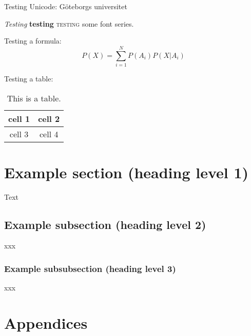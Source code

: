 \documentclass[11pt, a4paper]{article}
\begin{document}
Testing Unicode: Göteborgs universitet

\textit{Testing} \textbf{testing} \textsc{testing} some font series.

Testing a formula:
\[ P(X) = \sum_{i=1}^N P(A_i) P(X|A_i)
\]

Testing a table:
\begin{table}[htbp]
\begin{center}
\begin{tabular}{c|c} cell 1 & cell 2 \\ \hline cell 3 & cell 4
\end{tabular}
\caption{This is a table.}
\end{center}
\end{table}

\newpage

\section{Example section (heading level 1)}

Text

\subsection{Example subsection (heading level 2)}

xxx

\subsubsection{Example subsubsection (heading level 3)}

xxx

\newpage




\newpage
\section{Appendices}
\end{document}
